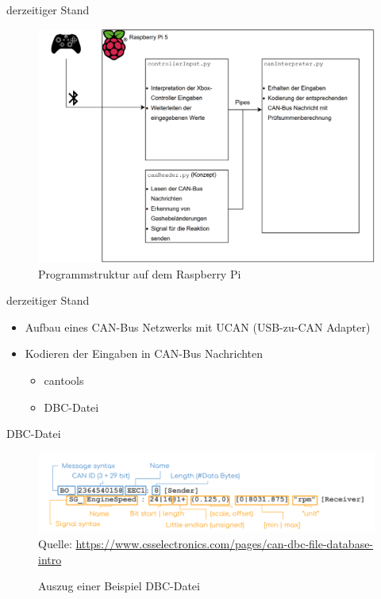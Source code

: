 \documentclass[usenames, dvipsnames, aspectratio=75]{beamer}
\begin{document}
\begin{frame}{derzeitiger Stand}
    \begin{figure}
        \centering
        \includegraphics[width=0.85\linewidth]{assets/piKonzept.png}
        \caption{Programmstruktur auf dem Raspberry Pi} 
    \end{figure}
\end{frame}

\begin{frame}{derzeitiger Stand}
    \begin{itemize}
        \item Aufbau eines CAN-Bus Netzwerks mit UCAN (USB-zu-CAN Adapter)
        \item Kodieren der Eingaben in CAN-Bus Nachrichten \begin{itemize}
            \item cantools
            \item DBC-Datei
        \end{itemize}
    \end{itemize}   
\end{frame}

\begin{frame}{DBC-Datei}
    \begin{figure}
        \centering
        \includegraphics[width=1\linewidth]{assets/CAN-DBC-File-Format-Explained-Intro-Basics_2.png}
        \tiny{Quelle: \url{https://www.csselectronics.com/pages/can-dbc-file-database-intro}}
        \caption{Auszug einer Beispiel DBC-Datei}
    \end{figure}
\end{frame}
\end{document}
